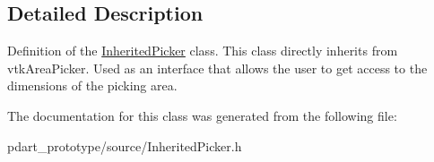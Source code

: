 \subsection{Detailed Description}
Definition of the \hyperlink{class_inherited_picker}{Inherited\+Picker} class. This class directly inherits from vtk\+Area\+Picker. Used as an interface that allows the user to get access to the dimensions of the picking area. 

The documentation for this class was generated from the following file\+:\begin{DoxyCompactItemize}
\item 
pdart\+\_\+prototype/source/Inherited\+Picker.\+h\end{DoxyCompactItemize}
